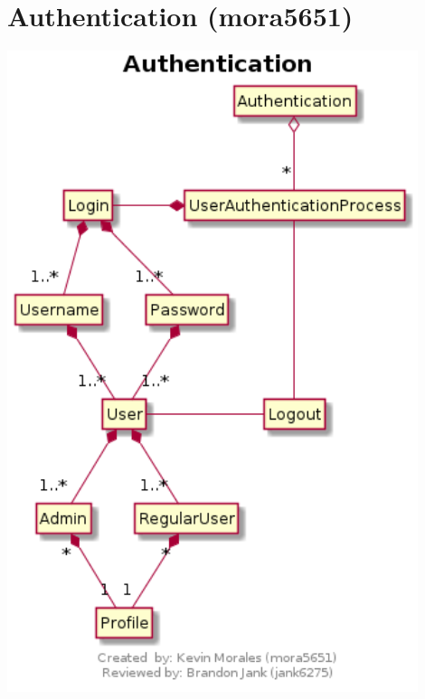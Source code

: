 \documentclass[11pt]{report}
\begin{document}
\section{Authentication (mora5651)}
        \begin{center}
        \includegraphics[width=0.9\textwidth]{diagrams/Authentication}
        \end{center}
\end{document}
